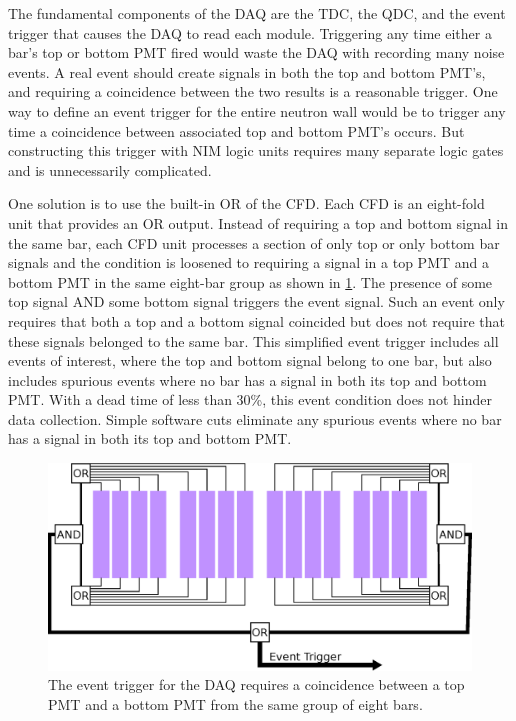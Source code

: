 The fundamental components of the DAQ are the TDC, the QDC, and the event trigger that causes the DAQ to read each module.  Triggering any time either a bar's top or bottom PMT fired would waste the DAQ with recording many noise events.  A real event should create signals in both the top and bottom PMT's, and requiring a coincidence between the two results is a reasonable trigger.  One way to define an event trigger for the entire neutron wall would be to trigger any time a coincidence between associated top and bottom PMT's occurs.  But constructing this trigger with NIM logic units requires many separate logic gates and is unnecessarily complicated.  

One solution is to use the built-in OR of the CFD.  Each CFD is an eight-fold unit that provides an OR output.  Instead of requiring a top and bottom signal in the same bar, each CFD unit processes a section of only top or only bottom bar signals and the condition is loosened to requiring a signal in a top PMT and a bottom PMT in the same eight-bar group as shown in \ref{fig:eventTrig}.  The presence of some top signal AND some bottom signal triggers the event signal.  Such an event only requires that both a top and a bottom signal coincided but does not require that these signals belonged to the same bar.  This simplified event trigger includes all events of interest, where the top and bottom signal belong to one bar, but also includes spurious events where no bar has a signal in both its top and bottom PMT.  With a dead time of less than 30\%, this event condition does not hinder data collection.  Simple software cuts eliminate any spurious events where no bar has a signal in both its top and bottom PMT.

\begin{figure}[htp]
\centering
\includegraphics[width=1.0\textwidth]{figures/event_trigger.eps}
\caption{The event trigger for the DAQ requires a coincidence between a top PMT and a bottom PMT from the same group of eight bars.}
\label{fig:eventTrig}
\end{figure}

